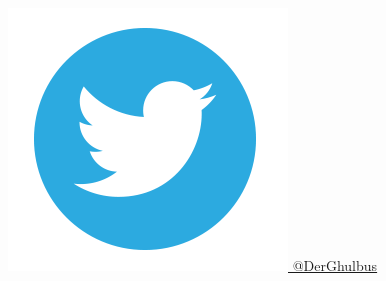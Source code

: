 \documentclass[aspectratio=169]{beamer}
\begin{document}
\begin{frame}
  \href{https://twitter.com/DerGhulbus/}{\includegraphics[height=.05\textheight]{resources/twitter-icon.png} @DerGhulbus}

\end{frame}
\end{document}
